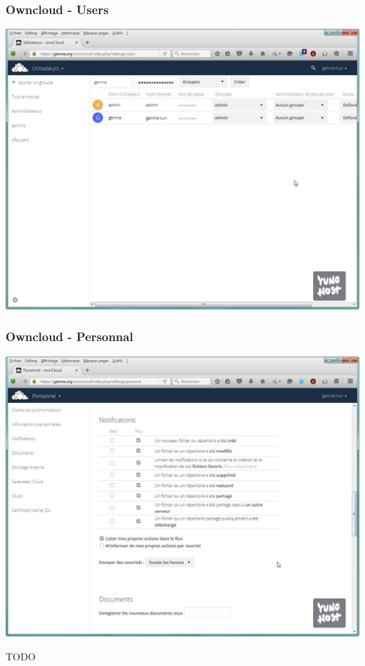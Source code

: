 \documentclass{beamer}
\begin{document}
\begin{frame}
\frametitle{Owncloud - Users}
\includegraphics[scale=0.4] {./Owncloud/Owncloud_Utilisateurs.jpg}
\end{frame}

\begin{frame}
\frametitle{Owncloud - Personnal}
\includegraphics[scale=0.4] {./Owncloud/Owncloud_Personnel.jpg}
\end{frame}

\begin{frame}
\Huge{\centerline{TODO}}
\end{frame}
\end{document}
